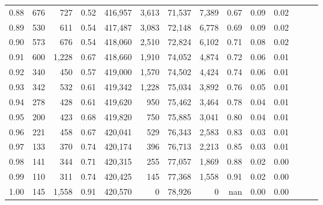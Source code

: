 \begin{tabular}{rrrrrrrrrrrrrr}
0.88 &     676 &    727 &  0.52 &  416,957 &    3,613 &  71,537 &   7,389 &  0.67 &  0.09 &      0.02 \\
0.89 &     530 &    611 &  0.54 &  417,487 &    3,083 &  72,148 &   6,778 &  0.69 &  0.09 &      0.02 \\
0.90 &     573 &    676 &  0.54 &  418,060 &    2,510 &  72,824 &   6,102 &  0.71 &  0.08 &      0.02 \\
0.91 &     600 &  1,228 &  0.67 &  418,660 &    1,910 &  74,052 &   4,874 &  0.72 &  0.06 &      0.01 \\
0.92 &     340 &    450 &  0.57 &  419,000 &    1,570 &  74,502 &   4,424 &  0.74 &  0.06 &      0.01 \\
0.93 &     342 &    532 &  0.61 &  419,342 &    1,228 &  75,034 &   3,892 &  0.76 &  0.05 &      0.01 \\
0.94 &     278 &    428 &  0.61 &  419,620 &      950 &  75,462 &   3,464 &  0.78 &  0.04 &      0.01 \\
0.95 &     200 &    423 &  0.68 &  419,820 &      750 &  75,885 &   3,041 &  0.80 &  0.04 &      0.01 \\
0.96 &     221 &    458 &  0.67 &  420,041 &      529 &  76,343 &   2,583 &  0.83 &  0.03 &      0.01 \\
0.97 &     133 &    370 &  0.74 &  420,174 &      396 &  76,713 &   2,213 &  0.85 &  0.03 &      0.01 \\
0.98 &     141 &    344 &  0.71 &  420,315 &      255 &  77,057 &   1,869 &  0.88 &  0.02 &      0.00 \\
0.99 &     110 &    311 &  0.74 &  420,425 &      145 &  77,368 &   1,558 &  0.91 &  0.02 &      0.00 \\
1.00 &     145 &  1,558 &  0.91 &  420,570 &        0 &  78,926 &       0 &   nan &  0.00 &      0.00 \\
\bottomrule
\end{tabular}
